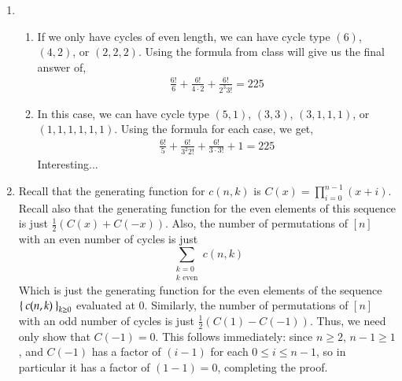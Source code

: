 \documentclass[12pt]{article}
\theoremstyle{definition}
\theoremstyle{remark}
\begin{document}
\begin{enumerate}[leftmargin=\labelsep]
		\item \begin{enumerate}
			\item If we only have cycles of even length, we can have cycle type $(6)$, $(4, 2)$, or $(2, 2, 2)$. Using the formula from class will give us the final answer of,
			\begin{align*}
				\frac{6!}{6} + \frac{6!}{4 \cdot 2} + \frac{6!}{2^3 3!} = 225
			\end{align*}
			
			\item In this case, we can have cycle type $(5, 1)$, $(3, 3)$, $(3, 1, 1, 1)$, or $(1, 1, 1, 1, 1, 1)$. Using the formula for each case, we get,
			\begin{align*}
				\frac{6!}{5} + \frac{6!}{3^2 2!} + \frac{6!}{3 \cdot 3!} + 1 = 225
			\end{align*}
			Interesting...
		\end{enumerate}
		\item Recall that the generating function for $c(n,k)$ is $C(x)=\prod_{i=0}^{n-1} (x+i)$. Recall also that the generating function for the even elements of this sequence is just $\frac12(C(x) + C(-x))$. Also, the number of permutations of $[n]$ with an even number of cycles is just $$\sum_{\substack{k=0 \\ k\text{ even}}} c(n, k)$$
		Which is just the generating function for the even elements of the sequence $\Set{c(n,k)}_{k \geq 0}$ evaluated at 0. Similarly, the number of permutations of $[n]$ with an odd number of cycles is just $\frac12(C(1)-C(-1))$. Thus, we need only show that $C(-1) = 0$. This follows immediately: since $n \geq 2$, $n-1 \geq 1$, and $C(-1)$ has a factor of $(i-1)$ for each $0 \leq i \leq n-1$, so in particular it has a factor of $(1-1) = 0$, completing the proof.
		

\end{enumerate}
\end{document}
